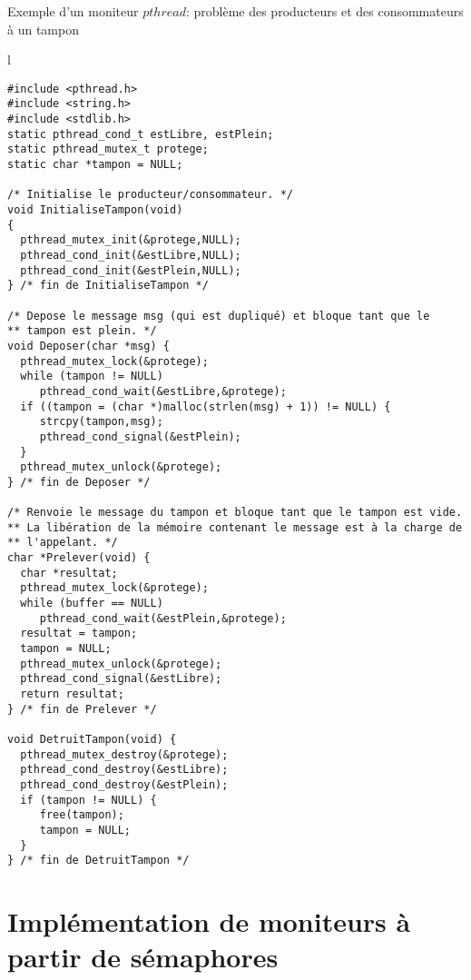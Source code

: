 \begin{algorithm}[!ht]
\caption{Exemple d'un moniteur $pthread$: problème des producteurs et des consommateurs à un tampon}\label{moniteurs:pthreadProdCons}
\centering
\begin{tabular}{l}
\lstset{language=C++}
\begin{lstlisting}
#include <pthread.h>
#include <string.h>
#include <stdlib.h>
static pthread_cond_t estLibre, estPlein;
static pthread_mutex_t protege;
static char *tampon = NULL;

/* Initialise le producteur/consommateur. */
void InitialiseTampon(void)
{
  pthread_mutex_init(&protege,NULL);
  pthread_cond_init(&estLibre,NULL);
  pthread_cond_init(&estPlein,NULL);
} /* fin de InitialiseTampon */

/* Depose le message msg (qui est dupliqué) et bloque tant que le
** tampon est plein. */
void Deposer(char *msg) {
  pthread_mutex_lock(&protege);
  while (tampon != NULL)
     pthread_cond_wait(&estLibre,&protege);
  if ((tampon = (char *)malloc(strlen(msg) + 1)) != NULL) {
     strcpy(tampon,msg);
     pthread_cond_signal(&estPlein);
  }
  pthread_mutex_unlock(&protege);
} /* fin de Deposer */

/* Renvoie le message du tampon et bloque tant que le tampon est vide.
** La libération de la mémoire contenant le message est à la charge de
** l'appelant. */
char *Prelever(void) {
  char *resultat;
  pthread_mutex_lock(&protege);
  while (buffer == NULL)
     pthread_cond_wait(&estPlein,&protege);
  resultat = tampon;
  tampon = NULL;
  pthread_mutex_unlock(&protege);
  pthread_cond_signal(&estLibre);
  return resultat;
} /* fin de Prelever */

void DetruitTampon(void) {
  pthread_mutex_destroy(&protege);
  pthread_cond_destroy(&estLibre);
  pthread_cond_destroy(&estPlein);
  if (tampon != NULL) {
     free(tampon);
     tampon = NULL;
  }
} /* fin de DetruitTampon */
\end{lstlisting}
\end{tabular}

\end{algorithm}

\section{Implémentation de moniteurs à partir de sémaphores}

